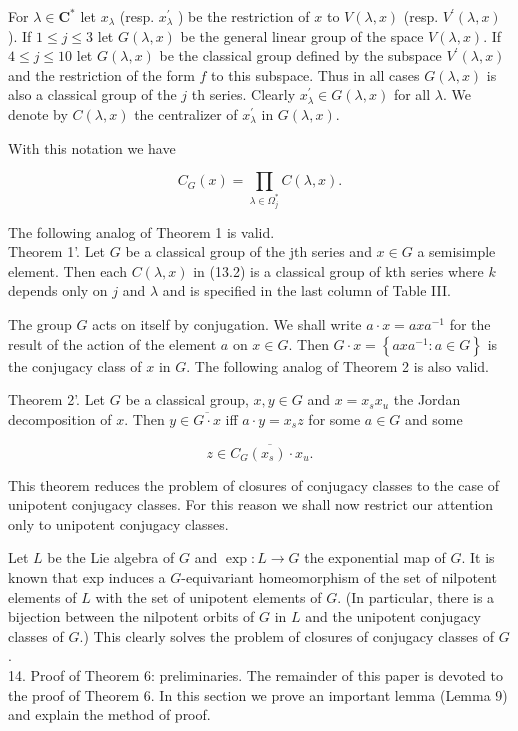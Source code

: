\documentclass[10pt]{article}
\begin{document}
For $\lambda \in \mathbf{C}^{*}$ let $x_{\lambda}$ (resp. $x_{\lambda}^{\prime}$ ) be the restriction of $x$ to $V(\lambda, x)$ (resp. $V^{\prime}(\lambda, x)$ ). If $1 \leqslant j \leqslant 3$ let $G(\lambda, x)$ be the general linear group of the space $V(\lambda, x)$. If $4 \leqslant j \leqslant 10$ let $G(\lambda, x)$ be the classical group defined by the subspace $V^{\prime}(\lambda, x)$ and the restriction of the form $f$ to this subspace. Thus in all cases $G(\lambda, x)$ is also a classical group of the $j$ th series. Clearly $x_{\lambda}^{\prime} \in G(\lambda, x)$ for all $\lambda$. We denote by $C(\lambda, x)$ the centralizer of $x_{\lambda}^{\prime}$ in $G(\lambda, x)$.

With this notation we have


\begin{equation*}
C_{G}(x)=\prod_{\lambda \in \Omega_{j}^{*}} C(\lambda, x) . \tag{13.2}
\end{equation*}


The following analog of Theorem 1 is valid.\\
Theorem 1'. Let $G$ be a classical group of the jth series and $x \in G$ a semisimple element. Then each $C(\lambda, x)$ in (13.2) is a classical group of kth series where $k$ depends only on $j$ and $\lambda$ and is specified in the last column of Table III.

The group $G$ acts on itself by conjugation. We shall write $a \cdot x=a x a^{-1}$ for the result of the action of the element $a$ on $x \in G$. Then $G \cdot x=\left\{a x a^{-1}: a \in G\right\}$ is the conjugacy class of $x$ in $G$. The following analog of Theorem 2 is also valid.

Theorem 2'. Let $G$ be a classical group, $x, y \in G$ and $x=x_{s} x_{u}$ the Jordan decomposition of $x$. Then $y \in \overline{G \cdot x}$ iff $a \cdot y=x_{s} z$ for some $a \in G$ and some


\begin{equation*}
z \in \overline{C_{G}\left(x_{s}\right) \cdot x_{u}} . \tag{13.3}
\end{equation*}


This theorem reduces the problem of closures of conjugacy classes to the case of unipotent conjugacy classes. For this reason we shall now restrict our attention only to unipotent conjugacy classes.

Let $L$ be the Lie algebra of $G$ and $\exp : L \rightarrow G$ the exponential map of $G$. It is known that exp induces a $G$-equivariant homeomorphism of the set of nilpotent elements of $L$ with the set of unipotent elements of $G$. (In particular, there is a bijection between the nilpotent orbits of $G$ in $L$ and the unipotent conjugacy classes of $G$.) This clearly solves the problem of closures of conjugacy classes of $G$.\\
14. Proof of Theorem 6: preliminaries. The remainder of this paper is devoted to the proof of Theorem 6. In this section we prove an important lemma (Lemma 9) and explain the method of proof.
\end{document}
